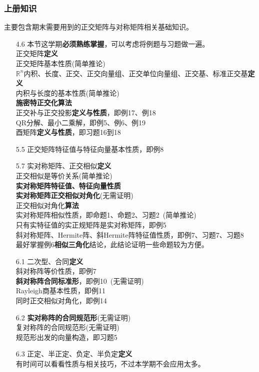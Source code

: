 \documentclass[a4paper,UTF8,fontset=windows,AutoFakeBold]{ctexart}
\newcommand*{\note}{\noindent *}
\begin{document}
\subsubsection{上册知识}
主要包含期末需要用到的正交矩阵与对称矩阵相关基础知识。
\begin{enumerate}
    \item[4.6] 
    \note 本节这学期\textbf{必须熟练掌握}，可以考虑将例题与习题做一遍。
    \\正交矩阵\textbf{定义}
    \\正交矩阵基本性质(简单推论)
    \\$\mathbb{R}^n$内积、长度、正交、正交向量组、正交单位向量组、正交基、标准正交基\textbf{定义}
    \\内积与长度的基本性质(简单推论)
    \\\textbf{施密特正交化算法}
    \\正交补与正交投影\textbf{定义与性质}，即例17、例18
    \\QR分解、最小二乘解，即例5、例6、例19
    \\酉矩阵\textbf{定义与性质}，即习题16到18
    \item[5.5] 正交矩阵特征值与特征向量基本性质，即例8
    \item[5.7] 实对称矩阵、正交相似\textbf{定义}
    \\正交相似是等价关系(简单推论)
    \\\textbf{实对称矩阵特征值、特征向量性质}
    \\\textbf{实对称矩阵正交相似对角化}(无需证明)
    \\正交相似对角化\textbf{算法}
    \\实对称矩阵相似性质，即命题1、命题2、习题2\ (简单推论)
    \\只有实特征值的实正规矩阵是实对称矩阵，即例5
    \\斜对称矩阵、Hermite阵、斜Hermite阵特征值性质，即例7、习题7、习题8
    \\\note 最好掌握例6\textbf{相似三角化}结论，此结论证明一些命题较为方便。
    \item[6.1] 二次型、合同\textbf{定义}
    \\斜对称阵等价性质，即例7
    \\\textbf{斜对称阵合同标准形}，即例10\ (无需证明)
    \\Rayleigh商基本性质，即例11
    \\同时正交相似对角化，即例14
    \item[6.2] \textbf{实对称阵的合同规范形}(无需证明)
    \\复对称阵的合同规范形(无需证明)
    \\规范形出发的向量构造，即习题5
    \item[6.3] 正定、半正定、负定、半负定\textbf{定义}
    \\\note 有时间可以看看性质与相关技巧，不过本学期不会应用太多。
\end{enumerate}
\end{document}

